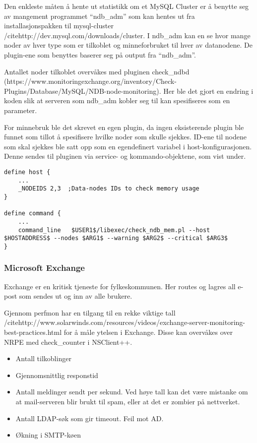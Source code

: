 Den enkleste måten å hente ut statistikk om et MySQL Cluster er å benytte seg av mangement programmet “ndb\_adm” som kan hentes ut fra installasjonspakken til mysql-cluster /cite{http://dev.mysql.com/downloads/cluster}. I ndb\_adm kan en se hvor mange noder av hver type som er tilkoblet og minneforbruket til hver av datanodene. De plugin-ene som benyttes baserer seg på output fra “ndb\_adm”.

Antallet noder tilkoblet overvåkes med pluginen check\_ndbd (https://www.monitoringexchange.org/inventory/Check-Plugins/Database/MySQL/NDB-node-monitoring). Her ble det gjort en endring i koden slik at serveren som ndb\_adm kobler seg til kan spesifiseres som en parameter.

For minnebruk ble det skrevet en egen plugin, da ingen eksisterende plugin ble funnet som tillot å spesifisere hvilke noder som skulle sjekkes. ID-ene til nodene som skal sjekkes ble satt opp som en egendefinert variabel i host-konfigurasjonen. Denne sendes til pluginen via service- og kommando-objektene, som vist under.

\begin{lstlisting}
define host {
	...
	_NODEIDS 2,3  ;Data-nodes IDs to check memory usage
}

define command {
	...
	command_line   $USER1$/libexec/check_ndb_mem.pl --host $HOSTADDRESS$ --nodes $ARG1$ --warning $ARG2$ --critical $ARG3$
}
\end{lstlisting}
\subsubsection{Microsoft Exchange}

Exchange er en kritisk tjeneste for fylkeskommunen. Her routes og lagres all e-post som sendes ut og inn av alle brukere. 

Gjennom perfmon har en tilgang til en rekke viktige tall /cite{http://www.solarwinds.com/resources/videos/exchange-server-monitoring-best-practices.html} for å måle ytelsen i Exchange. Disse kan overvåkes over NRPE med check\_counter i NSClient++.
\begin{itemize}
	\item Antall tilkoblinger
	\item Gjennomsnittlig responstid
	\item Antall meldinger sendt per sekund. Ved høye tall kan det være mistanke om at mail-serveren blir brukt til spam, eller at det er zombier på nettverket.
	\item Antall LDAP-søk som gir timeout. Feil mot AD.
	\item Økning i SMTP-køen
\end{itemize}

